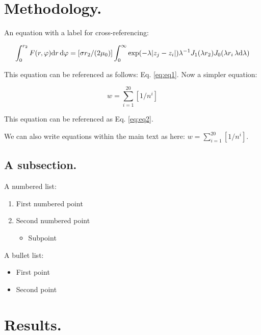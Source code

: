 \documentclass[12pt,halfline,a4paper,]{ouparticle}
\providecommand{\tightlist}{%
  \setlength{\itemsep}{0pt}\setlength{\parskip}{0pt}}
\begin{document}
\hypertarget{methodology.}{%
\section{Methodology.}\label{methodology.}}

An equation with a label for cross-referencing:

\begin{equation}\label{eq:eq1}
\int^{r_2}_0 F(r,\varphi){\rm d}r\,{\rm d}\varphi = [\sigma r_2/(2\mu_0)]
\int^{\infty}_0\exp(-\lambda|z_j-z_i|)\lambda^{-1}J_1 (\lambda r_2)J_0
(\lambda r_i\,\lambda {\rm d}\lambda)
\end{equation}

This equation can be referenced as follows: Eq. \ref{eq:eq1}. Now a
simpler equation:

\begin{equation}\label{eq:eq2}
w=\sum^{20}_{i=1}[1/n^i]
\end{equation}

This equation can be referenced as Eq. \ref{eq:eq2}.

We can also write equations within the main text as here:
\(w=\sum^{20}_{i=1}[1/n^i]\).

\hypertarget{a-subsection.}{%
\subsection{A subsection.}\label{a-subsection.}}

A numbered list:

\begin{enumerate}
\def\labelenumi{\arabic{enumi})}
\item
  First numbered point
\item
  Second numbered point

  \begin{itemize}
  \tightlist
  \item
    Subpoint
  \end{itemize}
\end{enumerate}

A bullet list:

\begin{itemize}
\tightlist
\item
  First point
\item
  Second point
\end{itemize}

\hypertarget{results.}{%
\section{Results.}\label{results.}}
\end{document}
